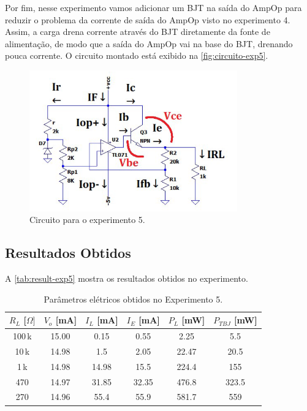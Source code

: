 \documentclass[
	12pt,				%
	oneside,			%
	a4paper,			%
	chapter=TITLE,
	sumario=tradicional,
	english,			%
	brazil				%
]{abntex2}
\begin{document}
Por fim, nesse experimento vamos adicionar um BJT na saída do AmpOp para reduzir 
o problema da corrente de saída do AmpOp visto no experimento 4. Assim, a carga drena corrente através do BJT diretamente 
da fonte de alimentação, de modo que a saída do AmpOp vai na base do BJT, drenando pouca corrente. 
O circuito montado está exibido na \autoref{fig:circuito-exp5}.

\begin{figure}[h!]
	\caption{\label{fig:circuito-exp5}Circuito para o experimento 5.}
	\begin{center}
    \includegraphics[width=0.8\textwidth,trim=1 1 1 1,clip]{images/circuito-exp5.png}
	\end{center}
\end{figure}

\subsection{Resultados Obtidos}

A \autoref{tab:result-exp5} mostra os resultados obtidos no experimento.

\begin{table}[htb]
	\caption{Parâmetros elétricos obtidos no Experimento 5.}
	\centering
	\begin{tabular}{c|c|c|c|c|c}
		\hline
		\textbf{$R_L$ [$\Omega]$} & \textbf{$V_o$ [mA]} & \textbf{$I_L$ [mA]} & \textbf{$I_E$ [mA]} & \textbf{$P_{L}$ [mW]} & \textbf{$P_{TBJ}$ [mW]} \\
		\hline
		100\,k & 15.00 & 0.15 & 0.55 & 2.25 & 5.5 \\
		10\,k  & 14.98 & 1.5 & 2.05 & 22.47 & 20.5 \\
		1\,k   & 14.98 & 14.98 & 15.5 & 224.4 & 155 \\
		470    & 14.97 & 31.85 & 32.35 & 476.8 & 323.5 \\
		270    & 14.96 & 55.4 & 55.9 & 581.7 & 559 \\
		\hline
	\end{tabular}
	\label{tab:result-exp5}
\end{table}
\end{document}
